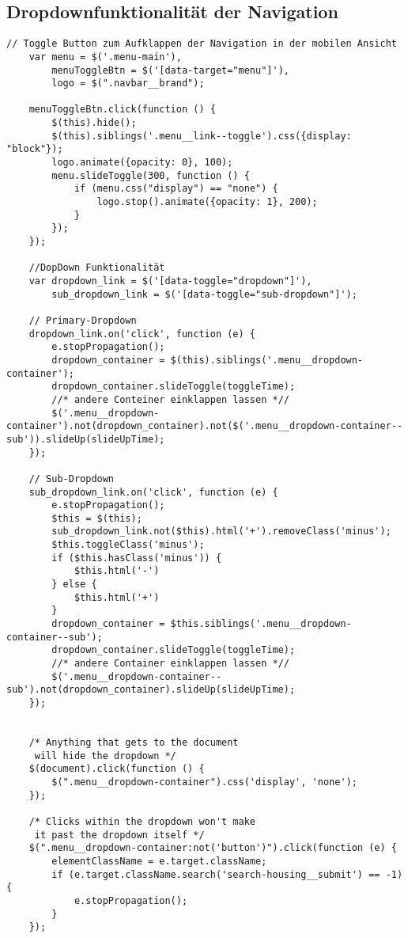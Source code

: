 \subsection{Dropdownfunktionalität der Navigation}
\label{app:Dropdown}
\begin{lstlisting}[style=htmlcssjs, backgroundcolor = \color{lightgray},
caption=Javascript Dropdownfunktionalität]
    // Toggle Button zum Aufklappen der Navigation in der mobilen Ansicht    
    var menu = $('.menu-main'),
        menuToggleBtn = $('[data-target="menu"]'),
        logo = $(".navbar__brand");

    menuToggleBtn.click(function () {
        $(this).hide();
        $(this).siblings('.menu__link--toggle').css({display: "block"});
        logo.animate({opacity: 0}, 100);
        menu.slideToggle(300, function () {
            if (menu.css("display") == "none") {
                logo.stop().animate({opacity: 1}, 200);
            }
        });
    });
    
    //DopDown Funktionalität
    var dropdown_link = $('[data-toggle="dropdown"]'),
        sub_dropdown_link = $('[data-toggle="sub-dropdown"]'); 
         
    // Primary-Dropdown
    dropdown_link.on('click', function (e) {
        e.stopPropagation();
        dropdown_container = $(this).siblings('.menu__dropdown-container');
        dropdown_container.slideToggle(toggleTime);
        //* andere Conteiner einklappen lassen *//
        $('.menu__dropdown-container').not(dropdown_container).not($('.menu__dropdown-container--sub')).slideUp(slideUpTime);
    });     
         
    // Sub-Dropdown
    sub_dropdown_link.on('click', function (e) {
        e.stopPropagation();
        $this = $(this);
        sub_dropdown_link.not($this).html('+').removeClass('minus');
        $this.toggleClass('minus');
        if ($this.hasClass('minus')) {
            $this.html('-')
        } else {
            $this.html('+')
        } 
        dropdown_container = $this.siblings('.menu__dropdown-container--sub');
        dropdown_container.slideToggle(toggleTime);
        //* andere Container einklappen lassen *//
        $('.menu__dropdown-container--sub').not(dropdown_container).slideUp(slideUpTime);
    });


    /* Anything that gets to the document
     will hide the dropdown */
    $(document).click(function () {
        $(".menu__dropdown-container").css('display', 'none');
    });

    /* Clicks within the dropdown won't make
     it past the dropdown itself */
    $(".menu__dropdown-container:not('button')").click(function (e) {
        elementClassName = e.target.className;
        if (e.target.className.search('search-housing__submit') == -1) {
            e.stopPropagation();
        }
    });
    
\end{lstlisting}
